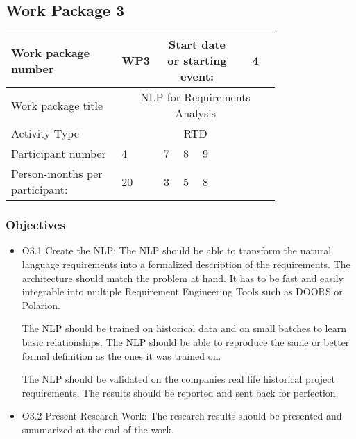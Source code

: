 \subsection{Work Package 3}

\begin{table}[hbpt]\centering
	\begin{tabular}{|p{0.35\linewidth}|p{0.06\linewidth}|p{0.06\linewidth}|p{0.06\linewidth}|
         p{0.06\linewidth}|p{0.06\linewidth}|p{0.06\linewidth}|p{0.06\linewidth}|}\hline
		 Work package number& WP3 &
		 \multicolumn{4}{|c|}{Start date or starting event:}{}&
		 \multicolumn{2}{|c|}{                        4 }{}\\\hline
		 Work package title&\multicolumn{7}{|c|}{\gls{NLP} for Requirements Analysis}{}\\\hline
		 Activity Type&\multicolumn{7}{|c|}{ RTD}{}\\\hline
		 Participant number & 4 & 7 & 8 & 9 & ~ & ~ & ~ \\\hline
		 Person-months per participant: & 20 & 3 & 5 & 8 & ~ & ~ & ~ \\\hline
	\end{tabular}
\end{table}

\subsubsection{Objectives}
\begin{itemize}
	\item O3.1 Create the \gls{NLP}: The \gls{NLP} should be able to transform the natural language requirements into a formalized description of the requirements. The architecture should match the problem at hand. It has to be fast and easily integrable into multiple Requirement Engineering Tools such as DOORS or Polarion.
	
	The \gls{NLP} should be trained on historical data and on small batches to learn basic relationships. The \gls{NLP} should be able to reproduce the same or better formal definition as the ones it was trained on.
	
	The \gls{NLP} should be validated on the companies real life historical project requirements. The results should be reported and sent back for perfection.
	
	\item O3.2 Present Research Work: The research results should be presented and summarized at the end of the work. 
\end{itemize}


